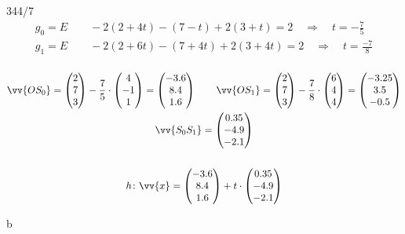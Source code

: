\begin{exercise}{344/7}
\begin{gather*}
    g_0 = E \qquad -2(2 + 4t) - (7 - t) + 2(3 + t) = 2 \quad\Rightarrow\quad t = -\frac{7}{5} \\
    g_1 = E \qquad -2(2 + 6t) - (7 + 4t) + 2(3 + 4t) = 2 \quad\Rightarrow\quad t = \frac{-7}{8} \\\\
  \end{gather*}
  \begin{gather*}
    \vv{OS_0} = \begin{pmatrix}2 \\ 7 \\ 3\end{pmatrix} - \frac{7}{5} \cdot \begin{pmatrix}4 \\ -1 \\ 1\end{pmatrix} = \begin{pmatrix}-3.6 \\ 8.4 \\ 1.6\end{pmatrix} \qquad \vv{OS_1} = \begin{pmatrix}2 \\ 7 \\ 3\end{pmatrix} - \frac{7}{8} \cdot \begin{pmatrix}6 \\ 4 \\ 4\end{pmatrix} = \begin{pmatrix}-3.25 \\ 3.5 \\ -0.5\end{pmatrix} \\
    \vv{S_0S_1} = \begin{pmatrix}0.35 \\ -4.9 \\ -2.1\end{pmatrix} \\\\
    h \colon \vv{x} = \begin{pmatrix}-3.6 \\ 8.4 \\ 1.6\end{pmatrix} + t \cdot \begin{pmatrix}0.35 \\ -4.9 \\ -2.1\end{pmatrix}
  \end{gather*}
  \item [b]

\end{exercise}
